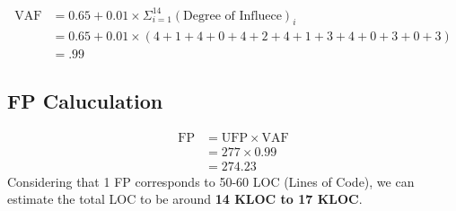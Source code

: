 \documentclass[11pt]{article}
\begin{document}
\begin{align}
    \text{VAF} & = 0.65 + 0.01\times\Sigma_{i=1}^{14}(\text{Degree of Influece})_i \\
               & = 0.65 + 0.01\times(4+1+4+0+4+2+4+1+3+4+0+3+0+3)                  \\
               & = .99
\end{align}
\subsection{FP Caluculation}
\begin{align}
    \text{FP} & = \text{UFP} \times \text{VAF} \\
              & = 277 \times 0.99              \\
              & = 274.23
\end{align}
Considering that 1 FP corresponds to 50-60 LOC (Lines of Code), we can estimate the total LOC to be around \textbf{14 KLOC to 17 KLOC}.
\end{document}
